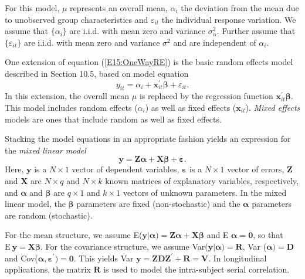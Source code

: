 For this model, $\mu$ represents an overall mean, $\alpha_i$ the
deviation from the mean due to unobserved group characteristics and
$\varepsilon_{it}$ the individual response variation. We assume that
$\{\alpha_i\}$ are i.i.d. with mean zero and variance
$\sigma^2_{\alpha}$. Further assume that $\{\varepsilon_{it}\}$ are
i.i.d. with mean zero and variance $\sigma^2$ and are independent of
$\alpha_i$.

One extension of equation (\ref{E15:OneWayRE}) is the basic random
effects model described in Section 10.5, based on model equation
\begin{equation}\label{E15:BasicRE}
y_{it} =\alpha_i + \mathbf{x}_{it}^{\prime} \boldsymbol \beta +
\varepsilon_{it}.
\end{equation}
\noindent In this extension, the overall mean $\mu$ is replaced by
the regression function $\mathbf{x}_{it}^{\prime} \boldsymbol
\beta$. This model includes random effects ($\alpha_i$) as well as
fixed effects ($\mathbf{x}_{it}$). \textit{Mixed effects} models are
ones that include random as well as fixed effects.



Stacking the model equations in an appropriate fashion yields an
expression for the \emph{mixed linear model}
\begin{equation}\label{E15:MixedLinModel}
\mathbf{y} = \mathbf{Z} \boldsymbol \alpha +  \mathbf{X} \boldsymbol
\beta +\boldsymbol \varepsilon .
\end{equation}
Here, $\mathbf{y}$ is a $N \times 1$ vector of dependent variables,
$\boldsymbol \varepsilon $ is a $N \times 1$ vector of errors,
\textbf{Z} and \textbf{X} are $N \times q$ and $N \times k$ known
matrices of explanatory variables, respectively, and $\boldsymbol
\alpha $ and $\boldsymbol \beta$ are $q \times 1$ and $k \times 1$
vectors of unknown parameters. In the mixed linear model, the
$\boldsymbol \beta$ parameters are fixed (non-stochastic) and the
$\boldsymbol \alpha $ parameters are random (stochastic).

For the mean structure, we assume E($\mathbf{y}|\boldsymbol \alpha)
= \mathbf{Z} \boldsymbol \alpha +  \mathbf{X} \boldsymbol \beta$ and
E $\boldsymbol \alpha = \mathbf{0}$, so that $\mathrm{E}~\mathbf{y}
= \mathbf{X} \boldsymbol \beta$. For the covariance structure, we
assume Var($\mathbf{y}|\boldsymbol \alpha) = \mathbf{R}$, Var
($\boldsymbol \alpha)= \mathbf{D}$ and Cov($\boldsymbol
\alpha,\boldsymbol \varepsilon ^{\prime} )= \mathbf{0}$. This yields
Var $\mathbf{y} = \mathbf{Z D Z}^{\prime} + \mathbf{R = V}$. In
longitudinal applications, the matrix $\mathbf{R}$ is used to model
the intra-subject serial correlation.


